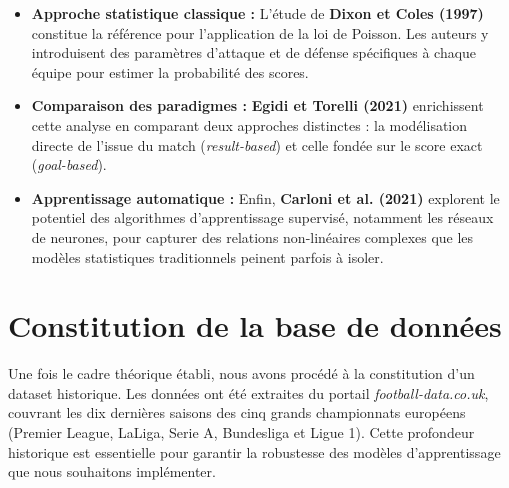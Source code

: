 \begin{itemize}
    \item \textbf{Approche statistique classique :} L'étude de 
    \textbf{Dixon et Coles (1997)} \cite{dixon} constitue la référence pour 
    l'application de la loi de Poisson. Les auteurs y introduisent des paramètres 
    d'attaque et de défense spécifiques à chaque équipe pour estimer la probabilité 
    des scores.
    \item \textbf{Comparaison des paradigmes :} \textbf{Egidi et Torelli (2021)} 
    \cite{egidi} enrichissent cette analyse en comparant deux approches distinctes :
     la modélisation directe de l'issue du match (\textit{result-based}) et celle 
     fondée sur le score exact (\textit{goal-based}).
    \item \textbf{Apprentissage automatique :} Enfin, \textbf{Carloni et al. (2021)}
     \cite{carloni} explorent le potentiel des 
    algorithmes d'apprentissage supervisé, notamment les réseaux de neurones, 
    pour capturer des relations non-linéaires complexes que les modèles statistiques 
    traditionnels peinent parfois à isoler.
\end{itemize}

\section{Constitution de la base de données}
Une fois le cadre théorique établi, nous avons procédé à la constitution d'un dataset 
historique. Les données ont été extraites du portail \textit{football-data.co.uk}, 
couvrant les dix dernières saisons des cinq grands championnats européens (Premier 
League, LaLiga, Serie A, Bundesliga et Ligue 1). Cette profondeur historique est 
essentielle pour garantir la robustesse des modèles d'apprentissage que nous 
souhaitons implémenter.